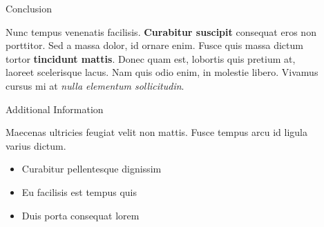 \documentclass[final]{beamer}
\newlength{\sepwid}
\newlength{\onecolwid}
\newlength{\twocolwid}
\begin{document}
\begin{frame}[t]
\begin{columns}[t]
\begin{column}{\twocolwid}
\begin{columns}[t,totalwidth=\twocolwid]
\begin{column}{\onecolwid}

\end{column} %

\end{columns} %

\end{column} %

\begin{column}{\sepwid}\end{column} %

\begin{column}{\onecolwid} %


\begin{block}{Conclusion}

Nunc tempus venenatis facilisis. \textbf{Curabitur suscipit} consequat eros non porttitor. Sed a massa dolor, id ornare enim. Fusce quis massa dictum tortor \textbf{tincidunt mattis}. Donec quam est, lobortis quis pretium at, laoreet scelerisque lacus. Nam quis odio enim, in molestie libero. Vivamus cursus mi at \textit{nulla elementum sollicitudin}.

\end{block}


\begin{block}{Additional Information}

Maecenas ultricies feugiat velit non mattis. Fusce tempus arcu id ligula varius dictum. 
\begin{itemize}
\item Curabitur pellentesque dignissim
\item Eu facilisis est tempus quis
\item Duis porta consequat lorem
\end{itemize}

\end{block}



\end{column}
\end{columns}
\end{frame}
\end{document}
